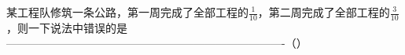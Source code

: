 
某工程队修筑一条公路，第一周完成了全部工程的$\frac{1}{10}$，第二周完成了全部工程的$\frac{3}{10}$，则一下说法中错误的是----------------------------------------------------------------------------（\hspace{4em}）

